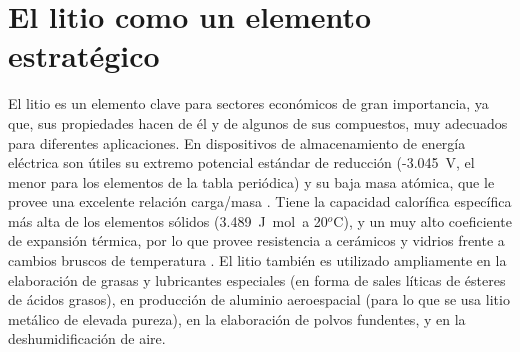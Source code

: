 \section{El litio como un elemento estratégico}
El litio es un elemento clave para sectores económicos de gran importancia, ya que, sus propiedades hacen de él y de algunos de sus compuestos, muy adecuados para diferentes aplicaciones. En dispositivos de almacenamiento de energía eléctrica son útiles su extremo potencial estándar de reducción (-3.045~V, el menor para los elementos de la tabla periódica) y su baja masa atómica, que le provee una excelente relación carga/masa \citep{Bagotsky2006}. Tiene la capacidad calorífica específica más alta de los elementos sólidos (3.489~J~mol\mnn\ a 20$^o$C), y un muy alto coeficiente de expansión térmica, por lo que provee resistencia a cerámicos y vidrios frente a cambios bruscos de temperatura \citep{Hart1973}. El litio también es utilizado ampliamente en la elaboración de grasas y lubricantes especiales (en forma de sales líticas de ésteres de ácidos grasos), en producción de aluminio aeroespacial (para lo que se usa litio metálico de elevada pureza), en la elaboración de polvos fundentes, y en la deshumidificación de aire.

